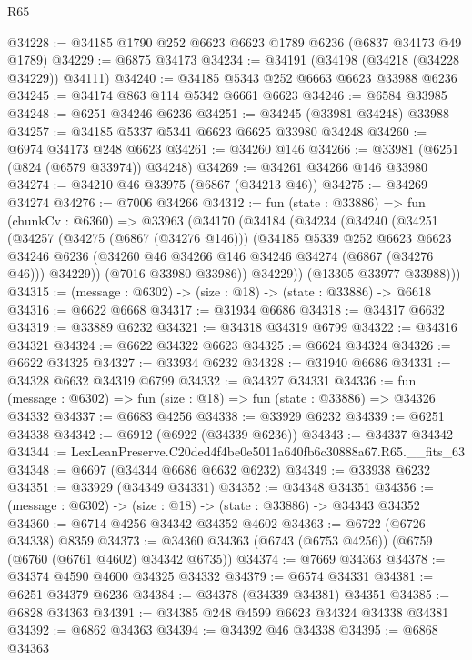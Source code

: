 \begin{lexlean}{R65}
\begin{coremodule}
{@34228 := @34185 @1790 @252 @6623 @6623 @1789 @6236 (@6837 @34173 @49 @1789)
@34229 := @6875 @34173
@34234 := @34191 (@34198 (@34218 (@34228 @34229)) @34111)
@34240 := @34185 @5343 @252 @6663 @6623 @33988 @6236
@34245 := @34174 @863 @114 @5342 @6661 @6623
@34246 := @6584 @33985
@34248 := @6251 @34246 @6236
@34251 := @34245 (@33981 @34248) @33988
@34257 := @34185 @5337 @5341 @6623 @6625 @33980 @34248
@34260 := @6974 @34173 @248 @6623
@34261 := @34260 @146
@34266 := @33981 (@6251 (@824 (@6579 @33974)) @34248)
@34269 := @34261 @34266 @146 @33980
@34274 := @34210 @46 @33975 (@6867 (@34213 @46))
@34275 := @34269 @34274
@34276 := @7006 @34266
@34312 := fun (state : @33886) =>
  fun (chunkCv : @6360) =>
  @33963
    (@34170
      (@34184
        (@34234
          (@34240
            (@34251
              (@34257
                (@34275 (@6867 (@34276 @146)))
                (@34185
                  @5339
                  @252
                  @6623
                  @6623
                  @34246
                  @6236
                  (@34260 @46 @34266 @146 @34246 @34274 (@6867 (@34276 @46)))
                  @34229))
              (@7016 @33980 @33986))
            @34229))
        (@13305 @33977 @33988)))
@34315 := (message : @6302) -> (size : @18) -> (state : @33886) -> @6618
@34316 := @6622 @6668
@34317 := @31934 @6686
@34318 := @34317 @6632
@34319 := @33889 @6232
@34321 := @34318 @34319 @6799
@34322 := @34316 @34321
@34324 := @6622 @34322 @6623
@34325 := @6624 @34324
@34326 := @6622 @34325
@34327 := @33934 @6232
@34328 := @31940 @6686
@34331 := @34328 @6632 @34319 @6799
@34332 := @34327 @34331
@34336 := fun (message : @6302) => fun (size : @18) => fun (state : @33886) => @34326 @34332
@34337 := @6683 @4256
@34338 := @33929 @6232
@34339 := @6251 @34338
@34342 := @6912 (@6922 (@34339 @6236))
@34343 := @34337 @34342
@34344 := LexLeanPreserve.C20ded4f4be0e5011a640fb6c30888a67.R65.__fits_63
@34348 := @6697 (@34344 @6686 @6632 @6232)
@34349 := @33938 @6232
@34351 := @33929 (@34349 @34331)
@34352 := @34348 @34351
@34356 := (message : @6302) -> (size : @18) -> (state : @33886) -> @34343 @34352
@34360 := @6714 @4256 @34342 @34352 @4602
@34363 := @6722 (@6726 @34338) @8359
@34373 := @34360 @34363 (@6743 (@6753 @4256)) (@6759 (@6760 (@6761 @4602) @34342 @6735))
@34374 := @7669 @34363
@34378 := @34374 @4590 @4600 @34325 @34332
@34379 := @6574 @34331
@34381 := @6251 @34379 @6236
@34384 := @34378 (@34339 @34381) @34351
@34385 := @6828 @34363
@34391 := @34385 @248 @4599 @6623 @34324 @34338 @34381
@34392 := @6862 @34363
@34394 := @34392 @46 @34338
@34395 := @6868 @34363
}
\end{coremodule}
\end{lexlean}

